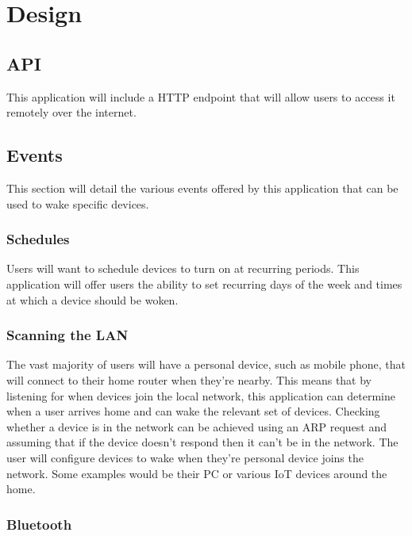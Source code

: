 
\section{Design}

\subsection{API}

This application will include a HTTP endpoint that will allow users to access it remotely over the internet.

\subsection{Events}

This section will detail the various events offered by this application that can be used to wake specific devices.

\subsubsection{Schedules}

Users will want to schedule devices to turn on at recurring periods. This application will offer users the ability to set recurring days of the week and times at which a device should be woken.

\subsubsection{Scanning the LAN}

The vast majority of users will have a personal device, such as mobile phone, that will connect to their home router when they're nearby. This means that by listening for when devices join the local network, this application can determine when a user arrives home and can wake the relevant set of devices.
\x
Checking whether a device is in the network can be achieved using an ARP request and assuming that if the device doesn't respond then it can't be in the network.
\x
The user will configure devices to wake when they're personal device joins the network. Some examples would be their PC or various IoT devices around the home.

\subsubsection{Bluetooth}


